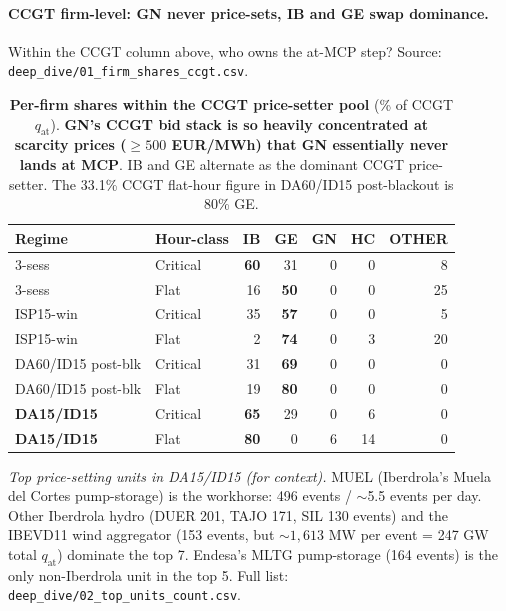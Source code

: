 \documentclass[11pt,a4paper]{article}
\newcommand{\code}[1]{\nolinkurl{#1}}
\begin{document}
\paragraph{CCGT firm-level: GN never price-sets, IB and GE swap dominance.} Within the CCGT column above, who owns the at-MCP step? Source: \code{deep_dive/01_firm_shares_ccgt.csv}.

\begin{table}[H]
\centering\scriptsize
\setlength{\tabcolsep}{5pt}
\begin{tabular}{l l r r r r r}
\toprule
Regime & Hour-class & IB & GE & GN & HC & OTHER \\
\midrule
3-sess              & Critical & \textbf{60} & 31 & 0 & 0 &  8 \\
3-sess              & Flat     & 16 & \textbf{50} & 0 & 0 & 25 \\
ISP15-win           & Critical & 35 & \textbf{57} & 0 & 0 &  5 \\
ISP15-win           & Flat     &  2 & \textbf{74} & 0 & 3 & 20 \\
DA60/ID15 post-blk  & Critical & 31 & \textbf{69} & 0 & 0 &  0 \\
DA60/ID15 post-blk  & Flat     & 19 & \textbf{80} & 0 & 0 &  0 \\
\textbf{DA15/ID15}  & Critical & \textbf{65} & 29 & 0 & 6 &  0 \\
\textbf{DA15/ID15}  & Flat     & \textbf{80} &  0 & 6 & 14 &  0 \\
\bottomrule
\end{tabular}
\caption{\textbf{Per-firm shares within the CCGT price-setter pool} (\% of CCGT $q_{\text{at}}$). \textbf{GN's CCGT bid stack is so heavily concentrated at scarcity prices ($\ge 500$ EUR/MWh) that GN essentially never lands at MCP}. IB and GE alternate as the dominant CCGT price-setter. The 33.1\% CCGT flat-hour figure in DA60/ID15 post-blackout is 80\% GE.}
\label{tab:ccgt_by_firm}
\end{table}

\emph{Top price-setting units in DA15/ID15 (for context).} MUEL (Iberdrola's Muela del Cortes pump-storage) is the workhorse: 496 events / $\sim$5.5 events per day. Other Iberdrola hydro (DUER 201, TAJO 171, SIL 130 events) and the IBEVD11 wind aggregator (153 events, but $\sim 1{,}613$ MW per event = 247 GW total $q_{\text{at}}$) dominate the top 7. Endesa's MLTG pump-storage (164 events) is the only non-Iberdrola unit in the top 5. Full list: \code{deep_dive/02_top_units_count.csv}.
\end{document}
